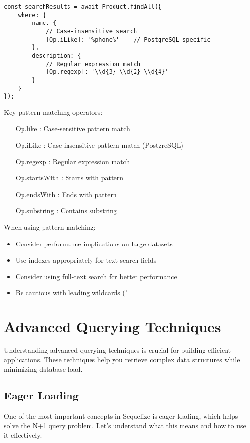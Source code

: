 \documentclass[12pt,a4paper]{book}
\begin{document}
	\begin{verbatim}
const searchResults = await Product.findAll({
	where: {
		name: {
			// Case-insensitive search
			[Op.iLike]: '%phone%'    // PostgreSQL specific
		},
		description: {
			// Regular expression match
			[Op.regexp]: '\\d{3}-\\d{2}-\\d{4}'
		}
	}
});
	\end{verbatim}
	
	Key pattern matching operators:
	\begin{itemize}
		\item [Op.like]: Case-sensitive pattern match
		\item [Op.iLike]: Case-insensitive pattern match (PostgreSQL)
		\item [Op.regexp]: Regular expression match
		\item [Op.startsWith]: Starts with pattern
		\item [Op.endsWith]: Ends with pattern
		\item [Op.substring]: Contains substring
	\end{itemize}
	
	\begin{tcolorbox}[title=Important Note]
		When using pattern matching:
		\begin{itemize}
			\item Consider performance implications on large datasets
			\item Use indexes appropriately for text search fields
			\item Consider using full-text search for better performance
			\item Be cautious with leading wildcards ('%
		\end{itemize}
	\end{tcolorbox}
	
	\section{Advanced Querying Techniques}
	Understanding advanced querying techniques is crucial for building efficient applications. These techniques help you retrieve complex data structures while minimizing database load.
	
	\subsection{Eager Loading}
	One of the most important concepts in Sequelize is eager loading, which helps solve the N+1 query problem. Let's understand what this means and how to use it effectively.
	
\end{document}
